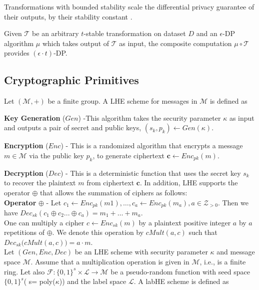 Transformations with bounded stability scale the differential privacy guarantee of their outputs, by their stability constant \cite{PINQ}.
\begin{theorem}
Given $\mathcal{T}$ be an arbitrary $t$-stable transformation on dataset $D$ and an $\epsilon$-DP algorithm $\mu$ which takes output of $\mathcal{T}$ as input, the composite computation $\mu \circ \mathcal{T}$ provides $(\epsilon \cdot t)$-DP.\end{theorem}
\subsection{Cryptographic Primitives}
Let $(\mathcal{M}, +)$ be a finite group. A \textsf{LHE} scheme
for messages in $\mathcal{M}$ is defined  as \squishlist
\item \textbf{Key Generation }($Gen$) -This  algorithm takes the security parameter $\kappa$ as input and outputs
a pair of secret and public keys, $(s_k, p_k) \leftarrow Gen(\kappa)$.
\item \textbf{Encryption} ($Enc$) - This is a randomized algorithm that encrypts a message $m \in \mathcal{M}$ via the public key $p_k$, to generate ciphertext $\mathbf{c} \leftarrow Enc_{pk}(m)$.
\item \textbf{Decryption} ($Dec$) - This is a deterministic function that uses the secret key $s_k$ to
recover the plaintext $m$ from ciphertext $\mathbf{c}$.
\squishend
In addition, \textsf{LHE} supports the operator $\oplus$ that allows the summation of ciphers as follows:
\\ \textbf{Operator} $\oplus$ - Let $c_1 \leftarrow Enc_{pk}(m1), \ldots, c_a \leftarrow Enc_{pk}(m_a), a \in \mathcal{Z}_{>0}$. Then we have  $Dec_{sk}(c_1\oplus c_2 ...\oplus c_a)=    m_1 + \ldots   + m_a$.  \\
One can multiply a cipher $c\leftarrow  Enc_{sk}(m)$ by a plaintext positive integer $a$ by $a$ repetitions of $\oplus$. We denote this operation by $cMult(a,c)$ such that $Dec_{sk}\big(cMult(a,c)\big)=a\cdot m$.\\
Let $(Gen,Enc,Dec)$ be an \textsf{LHE} scheme with security parameter $\kappa$ and message space $\mathcal{M}$. Assume that a multiplication operation is given in $\mathcal{M}$, i.e., is a finite ring. Let also $\mathcal{F}:\{0,1\}^s \times \mathcal{L}\rightarrow \mathcal{M}$ be a pseudo-random function with seed space $\{0,1\}^s$( s= poly($\kappa $)) and the label space $\mathcal{L}$. A \textsf{labHE} scheme is defined as

